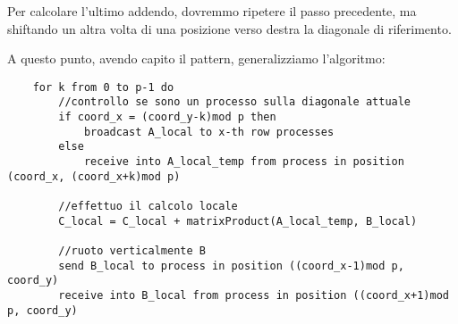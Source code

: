 Per calcolare l'ultimo addendo, dovremmo ripetere il passo precedente, ma shiftando un altra volta di una posizione verso destra la diagonale di riferimento.

A questo punto, avendo capito il pattern, generalizziamo l'algoritmo:
\begin{lstlisting}
    for k from 0 to p-1 do
        //controllo se sono un processo sulla diagonale attuale
        if coord_x = (coord_y-k)mod p then
            broadcast A_local to x-th row processes
        else
            receive into A_local_temp from process in position (coord_x, (coord_x+k)mod p)

        //effettuo il calcolo locale
        C_local = C_local + matrixProduct(A_local_temp, B_local)

        //ruoto verticalmente B
        send B_local to process in position ((coord_x-1)mod p, coord_y)
        receive into B_local from process in position ((coord_x+1)mod p, coord_y)
\end{lstlisting}